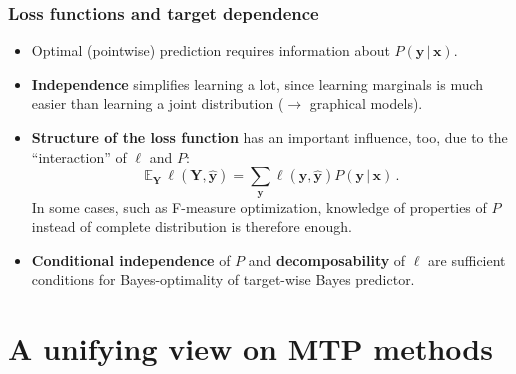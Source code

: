\documentclass[]{beamer}
\renewcommand{\Pr}{P}
\newcommand{\bx}{\boldsymbol{x}}
\newcommand{\by}{\boldsymbol{y}}
\renewcommand{\emph}[1]{\textbf{\color{putblue}#1}}
\begin{document}



\begin{frame}
\frametitle{Loss functions and target dependence}
\begin{itemize}
\item Optimal (pointwise) prediction requires information about $\Pr( \by \, \vert \, \bx)$.
\item \emph{Independence} simplifies learning a lot, since learning marginals is much easier than learning a joint distribution ($\rightarrow$ graphical models).
\item \emph{Structure of the loss function} has an important influence, too, due to the ``interaction'' of $\ell$ and $\Pr$:
$$
\mathbb{E}_{\mathbf{Y}} \, \ell(\mathbf{Y}, \hat{\by}) =  \sum_{\by} \ell(\by, \hat{\by}) \Pr(\by \, \vert \, \bx) \, .
$$
In some cases, such as F-measure optimization, knowledge of properties of $\Pr$ instead of complete distribution is therefore enough. 
\item \emph{Conditional independence} of $\Pr$ and \emph{decomposability} of $\ell$ are sufficient conditions for Bayes-optimality of target-wise Bayes predictor.
\end{itemize}
\end{frame}







\section{A unifying view on MTP methods}
\end{document}
